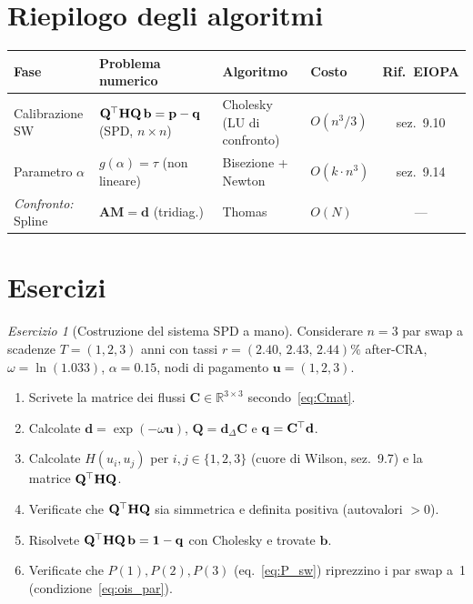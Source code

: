 \documentclass[11pt,a4paper]{article}
\theoremstyle{plain}
\theoremstyle{definition}
\theoremstyle{remark}
\newtheorem{esercizio}{Esercizio}[section]
\newcommand{\R}{\mathbb{R}}
\newcommand{\bfb}{\mathbf{b}}
\newcommand{\bfp}{\mathbf{p}}
\newcommand{\bfq}{\mathbf{q}}
\newcommand{\bfd}{\mathbf{d}}
\newcommand{\bfu}{\mathbf{u}}
\newcommand{\bfone}{\mathbf{1}}
\newcommand{\Hmat}{\mathbf{H}}
\newcommand{\Cmat}{\mathbf{C}}
\newcommand{\Qmat}{\mathbf{Q}}
\newcommand{\transp}{^{\mskip-1mu\top}}
\begin{document}
\section*{Riepilogo degli algoritmi}

\begin{center}\small
\renewcommand{\arraystretch}{1.35}
\begin{tabular}{llllc}
\toprule
\textbf{Fase} &
\textbf{Problema numerico} &
\textbf{Algoritmo} &
\textbf{Costo} &
\textbf{Rif.\ EIOPA}\\
\midrule
Calibrazione SW &
$\Qmat\transp\Hmat\Qmat\,\bfb = \bfp-\bfq$ (SPD, $n\times n$) &
Cholesky (LU di confronto) &
$O(n^3/3)$ &
sez.~9.10\\
Parametro $\alpha$ &
$g(\alpha)=\tau$ (non lineare) &
Bisezione + Newton &
$O(k\cdot n^3)$ &
sez.~9.14\\
\midrule
\emph{Confronto:} Spline &
$\mathbf{A}\mathbf{M}=\mathbf{d}$ (tridiag.) &
Thomas &
$O(N)$ &
---\\
\bottomrule
\end{tabular}
\end{center}

\section{Esercizi}
\label{sec:esercizi}

\begin{esercizio}[Costruzione del sistema SPD a mano]
Considerare $n=3$ par swap a scadenze $T=(1,2,3)$ anni con tassi
$r=(2.40,\, 2.43,\, 2.44)\%$ after-CRA, $\omega=\ln(1.033)$, $\alpha=0.15$,
nodi di pagamento $\bfu=(1,2,3)$.
\begin{enumerate}[label=(\alph*)]
  \item Scrivete la matrice dei flussi $\Cmat\in\R^{3\times3}$ secondo~\eqref{eq:Cmat}.
  \item Calcolate $\bfd=\exp(-\omega\bfu)$, $\Qmat=\bfd_\Delta\Cmat$ e $\bfq=\Cmat\transp\bfd$.
  \item Calcolate $H(u_i,u_j)$ per $i,j\in\{1,2,3\}$ (cuore di Wilson, sez.~9.7) e la
        matrice $\Qmat\transp\Hmat\Qmat$.
  \item Verificate che $\Qmat\transp\Hmat\Qmat$ sia simmetrica e definita positiva
        (autovalori $>0$).
  \item Risolvete $\Qmat\transp\Hmat\Qmat\,\bfb=\bfone-\bfq$ con Cholesky e trovate $\bfb$.
  \item Verificate che $P(1),P(2),P(3)$ (eq.~\eqref{eq:P_sw}) riprezzino i par swap a~1
        (condizione~\eqref{eq:ois_par}).
\end{enumerate}
\end{esercizio}
\end{document}
